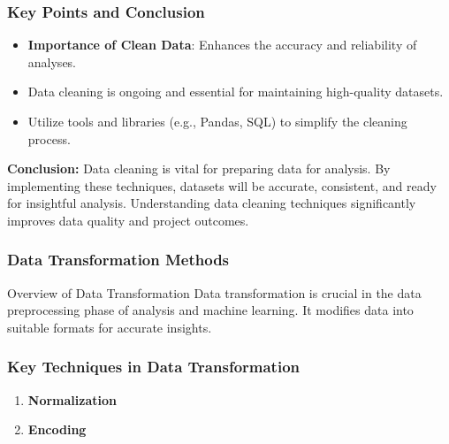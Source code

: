 \documentclass{beamer}
\begin{document}
\begin{frame}[fragile]
    \frametitle{Key Points and Conclusion}
    \begin{itemize}
        \item \textbf{Importance of Clean Data}: Enhances the accuracy and reliability of analyses.
        \item Data cleaning is ongoing and essential for maintaining high-quality datasets.
        \item Utilize tools and libraries (e.g., Pandas, SQL) to simplify the cleaning process.
    \end{itemize}
    
    \textbf{Conclusion:} Data cleaning is vital for preparing data for analysis. By implementing these techniques, datasets will be accurate, consistent, and ready for insightful analysis. Understanding data cleaning techniques significantly improves data quality and project outcomes.
\end{frame}

\begin{frame}[fragile]
    \frametitle{Data Transformation Methods}
    \begin{block}{Overview of Data Transformation}
        Data transformation is crucial in the data preprocessing phase of analysis and machine learning. It modifies data into suitable formats for accurate insights.
    \end{block}
\end{frame}

\begin{frame}[fragile]
    \frametitle{Key Techniques in Data Transformation}
    \begin{enumerate}
        \item \textbf{Normalization}
        \item \textbf{Encoding}
    \end{enumerate}
\end{frame}
\end{document}
